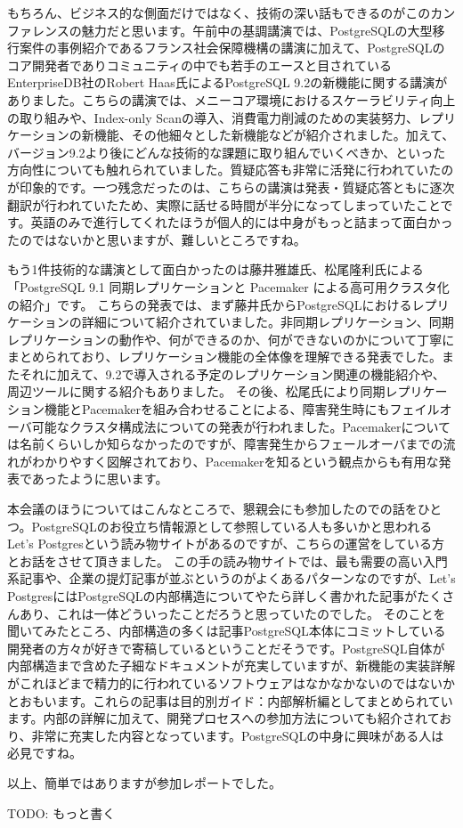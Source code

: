 もちろん、ビジネス的な側面だけではなく、技術の深い話もできるのがこのカンファレンスの魅力だと思います。午前中の基調講演では、PostgreSQLの大型移行案件の事例紹介であるフランス社会保障機構の講演に加えて、PostgreSQLのコア開発者でありコミュニティの中でも若手のエースと目されているEnterpriseDB社のRobert Haas氏によるPostgreSQL 9.2の新機能に関する講演がありました。こちらの講演では、メニーコア環境におけるスケーラビリティ向上の取り組みや、Index-only Scanの導入、消費電力削減のための実装努力、レプリケーションの新機能、その他細々とした新機能などが紹介されました。加えて、バージョン9.2より後にどんな技術的な課題に取り組んでいくべきか、といった方向性についても触れられていました。質疑応答も非常に活発に行われていたのが印象的です。一つ残念だったのは、こちらの講演は発表・質疑応答ともに逐次翻訳が行われていたため、実際に話せる時間が半分になってしまっていたことです。英語のみで進行してくれたほうが個人的には中身がもっと詰まって面白かったのではないかと思いますが、難しいところですね。

もう1件技術的な講演として面白かったのは藤井雅雄氏、松尾隆利氏による「PostgreSQL 9.1 同期レプリケーションと Pacemaker による高可用クラスタ化の紹介」です。 こちらの発表では、まず藤井氏からPostgreSQLにおけるレプリケーションの詳細について紹介されていました。非同期レプリケーション、同期レプリケーションの動作や、何ができるのか、何ができないのかについて丁寧にまとめられており、レプリケーション機能の全体像を理解できる発表でした。またそれに加えて、9.2で導入される予定のレプリケーション関連の機能紹介や、周辺ツールに関する紹介もありました。 その後、松尾氏により同期レプリケーション機能とPacemakerを組み合わせることによる、障害発生時にもフェイルオーバ可能なクラスタ構成法についての発表が行われました。Pacemakerについては名前くらいしか知らなかったのですが、障害発生からフェールオーバまでの流れがわかりやすく図解されており、Pacemakerを知るという観点からも有用な発表であったように思います。

本会議のほうについてはこんなところで、懇親会にも参加したのでの話をひとつ。PostgreSQLのお役立ち情報源として参照している人も多いかと思われるLet’s Postgresという読み物サイトがあるのですが、こちらの運営をしている方とお話をさせて頂きました。 この手の読み物サイトでは、最も需要の高い入門系記事や、企業の提灯記事が並ぶというのがよくあるパターンなのですが、Let’s PostgresにはPostgreSQLの内部構造についてやたら詳しく書かれた記事がたくさんあり、これは一体どういったことだろうと思っていたのでした。 そのことを聞いてみたところ、内部構造の多くは記事PostgreSQL本体にコミットしている開発者の方々が好きで寄稿しているということだそうです。PostgreSQL自体が内部構造まで含めた子細なドキュメントが充実していますが、新機能の実装詳解がこれほどまで精力的に行われているソフトウェアはなかなかないのではないかとおもいます。これらの記事は目的別ガイド：内部解析編としてまとめられています。内部の詳解に加えて、開発プロセスへの参加方法についても紹介されており、非常に充実した内容となっています。PostgreSQLの中身に興味がある人は必見ですね。

以上、簡単ではありますが参加レポートでした。

TODO: もっと書く
